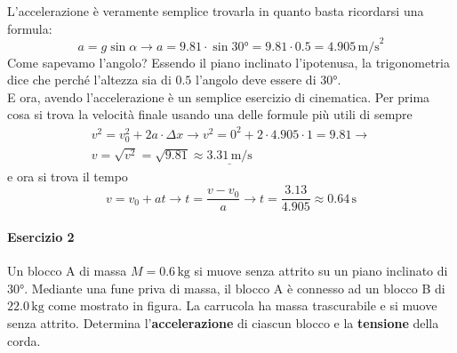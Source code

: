 L'accelerazione è veramente semplice trovarla in quanto basta ricordarsi una formula:
\begin{equation*}
  a = g\sin\alpha \rightarrow a = 9.81\cdot\sin\ang{30} = 9.81 \cdot 0.5 = \boxed{4.905\,\text{m/s}^2}
\end{equation*}
Come sapevamo l'angolo? Essendo il piano inclinato l'ipotenusa, la trigonometria dice che perché
l'altezza sia di $0.5$ l'angolo deve essere di $\ang{30}$.\\[\baselineskip]
E ora, avendo l'accelerazione è un semplice esercizio di cinematica. Per prima cosa si trova la
velocità finale usando una delle formule più utili di sempre
\begin{align*}
  v^2= v_0^2+2a\cdot\Delta x \rightarrow v^2 = 0^2 + 2\cdot4.905\cdot1 = 9.81 \rightarrow\\
  v = \sqrt{v^2} = \sqrt{9.81} \approx \underline{3.31\,\text{m/s}}
\end{align*}
e ora si trova il tempo
\begin{equation*}
  v = v_0 + at \rightarrow t = \frac{v-v_0}{a} \rightarrow t = \frac{3.13}{4.905} \approx 
  \boxed{0.64\,\text{s}}
\end{equation*}

\paragraph{Esercizio 2}
Un blocco A di massa $M = 0.6\,\text{kg}$ si muove senza attrito su un piano inclinato di $\ang{30}$. 
Mediante una fune priva di massa, il blocco A è connesso ad un blocco B di $22.0\,\text{kg}$ come 
mostrato in figura. La carrucola ha massa trascurabile e si muove senza attrito. Determina 
l'\textbf{accelerazione} di ciascun blocco e la \textbf{tensione} della corda.

\begin{center}
\end{center}
\divisor

